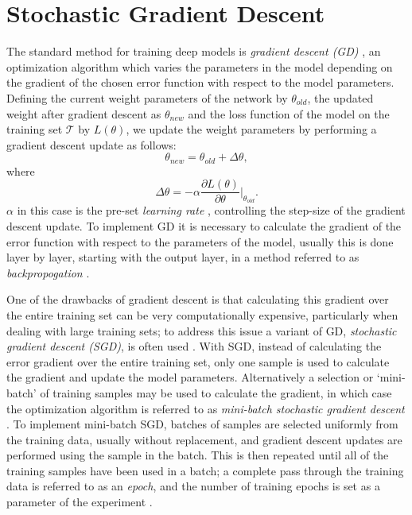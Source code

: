 \section{Stochastic Gradient Descent}
The standard method for training deep models is \textit{gradient descent (GD)} \cite{Witten2011} \cite{Theodoridis2009}, an optimization algorithm which varies the parameters in the model depending on the gradient of the chosen error function with respect to the model parameters. Defining the current weight parameters of the network by $\theta_{old}$, the updated weight after gradient descent as $\theta_{new}$ and the loss function of the model on the training set $\mathcal{T}$ by $L(\theta)$, we update the weight parameters by performing a gradient descent update as follows:
\begin{equation}
\theta_{new} = \theta_{old} + \Delta \theta,
\end{equation}
where
\begin{equation}
\Delta \theta = -\alpha \frac{\partial L(\theta)}{\partial\theta} |_{\theta_{old}}.
\end{equation}
$\alpha$ in this case is the pre-set \textit{learning rate} \cite{Witten2011}, controlling the step-size of the gradient descent update. To implement GD it is necessary to calculate the gradient of the error function with respect to the parameters of the model, usually this is done layer by layer, starting with the output layer, in a method referred to as \textit{backpropogation} \cite{lecun1988theoretical}. 

One of the drawbacks of gradient descent is that calculating this gradient over the entire training set can be very computationally expensive, particularly when dealing with large training sets; to address this issue a variant of GD, \textit{stochastic gradient descent (SGD)}, is often used \cite{shamir2013stochastic}. With SGD, instead of calculating the error gradient over the entire training set, only one sample is used to calculate the gradient and update the model parameters. Alternatively a selection or `mini-batch' of training samples may be used to calculate the gradient, in which case the optimization algorithm is referred to as \textit{mini-batch stochastic gradient descent} \cite{ruder2016overview}. To implement mini-batch SGD, batches of samples are selected uniformly from the training data, usually without replacement, and gradient descent updates are performed using the sample in the batch. This is then repeated until all of the training samples have been used in a batch; a complete pass through the training data is referred to as an \textit{epoch}, and the number of training epochs is set as a parameter of the experiment \cite{ruder2016overview}. 

